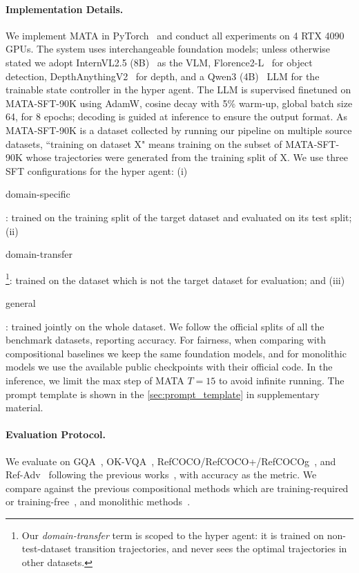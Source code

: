 \documentclass{article} %
\DeclareRobustCommand{\legendbg}[2]{%
\unskip
  \begingroup\setlength{\fboxsep}{0pt}
  \colorbox{#1}{\strut #2}%
  \endgroup
}
\newcommand{\revise}[1]{{#1}}
\newcommand{\methodname}{MATA}
\newcommand{\datasetname}{\methodname-SFT-90K}
\begin{document}
\paragraph{Implementation Details.}
\label{subsec:impl}
We implement \methodname{} in PyTorch~\citep{paszke_pytorch_2019} and conduct all experiments on 4 RTX 4090 GPUs. The system uses interchangeable foundation models; unless otherwise stated we adopt InternVL2.5 (8B)~\citep{chen_expanding_2025} as the VLM, Florence2-L~\citep{xiao_florence-2_2024} for object detection, DepthAnythingV2~\citep{yang_depth_2024} for depth, and a Qwen3 (4B)~\citep{yang_qwen3_2025} LLM for the trainable state controller in the hyper agent. The LLM is supervised finetuned on \datasetname{} using AdamW, cosine decay with 5\% warm-up, global batch size 64, for 8 epochs; decoding is guided at inference to ensure the output format. As \datasetname{} is a dataset collected by running our pipeline on multiple source datasets, ``training on dataset X" means training on the subset of \datasetname{} whose trajectories were generated from the training split of X. We use three SFT configurations for the hyper agent: (i) \legendbg{green!20}{domain-specific}: trained on the training split of the target dataset and evaluated on its test split; (ii) \legendbg{yellow!25}{\revise{domain-transfer}}\footnote{\revise{Our \emph{\revise{domain-transfer}} term is scoped to the hyper agent: it is trained on non-test-dataset transition trajectories, and never sees the optimal trajectories in other datasets.}}: trained on the dataset which is not the target dataset for \revise{evaluation}; and (iii) \legendbg{blue!15}{general}: trained jointly on the whole dataset. We follow the official splits of all the benchmark datasets, reporting accuracy. For fairness, when comparing with compositional baselines we keep the same foundation models, and for monolithic models we use the available public checkpoints with their official code. 
\revise{In the inference, we limit the max step of \methodname{} $T=15$ to avoid infinite running. The prompt template is shown in the \autoref{sec:prompt_template} in supplementary material.}

\paragraph{Evaluation Protocol.}
We evaluate on GQA~\citep{hudson_gqa_2019}, OK-VQA~\citep{marino_ok-vqa_2019}, RefCOCO/RefCOCO+/RefCOCOg~\citep{kazemzadeh_referitgame_2014}, and Ref-Adv~\citep{akula_words_2020} following the previous works~\citep{suris_vipergpt_2023, ke_hydra_2024, cai_naver_2025}, with accuracy as the metric. We compare against the previous compositional methods which are training-required~\citep{khan_self-training_2024, ke_dwim_2025} or training-free~\citep{suris_vipergpt_2023, ke_hydra_2024, cai_naver_2025}, and monolithic methods~\citep{li_blip-2_2023, zhu_minigpt-4_2023, liu_visual_2023, su_pandagpt_2023, han_imagebind-llm_2023, dai_instructblip_2023, li_otter_2023, wang_qwen2-vl_2024, bai_qwen25-vl_2025, chen_expanding_2025, zhu_internvl3_2025, wang_internvl35_2025, openai_gpt-4o_2024, tiong_plug-and-play_2022, yang_empirical_2022, alayrac_flamingo_2022}.
\end{document}
